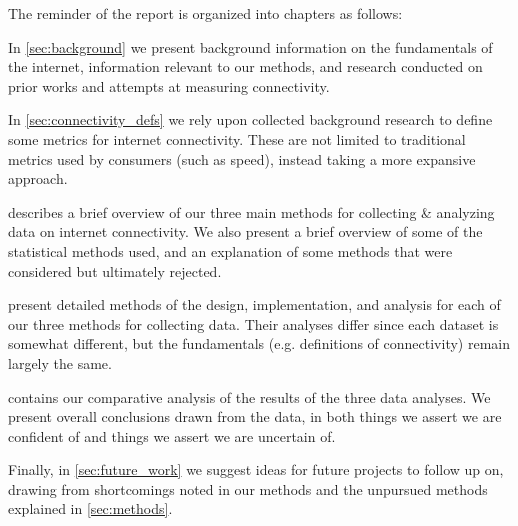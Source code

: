 The reminder of the report is organized into chapters as follows:

In \cref{sec:background} we present background information on the fundamentals of the internet, information relevant to our methods, and research conducted on prior works and attempts at measuring connectivity.

In \cref{sec:connectivity_defs} we rely upon collected background research to define some metrics for internet connectivity. These are not limited to traditional metrics used by consumers (such as speed), instead taking a more expansive approach.

 describes a brief overview of our three main methods for collecting \& analyzing data on internet connectivity. We also present a brief overview of some of the statistical methods used, and an explanation of some methods that were considered but ultimately rejected.

 present detailed methods of the design, implementation, and analysis for each of our three methods for collecting data. Their analyses differ since each dataset is somewhat different, but the fundamentals (e.g. definitions of connectivity) remain largely the same.

 contains our comparative analysis of the results of the three data analyses. We present overall conclusions drawn from the data, in both things we assert we are confident of and things we assert we are uncertain of.

Finally, in \cref{sec:future_work} we suggest ideas for future projects to follow up on, drawing from shortcomings noted in our methods and the unpursued methods explained in \cref{sec:methods}.

